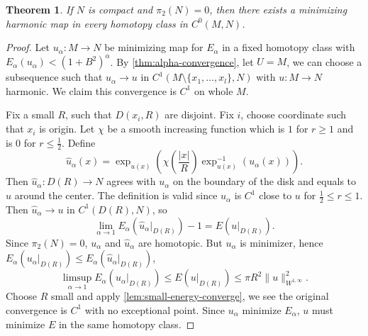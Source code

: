 \documentclass[UTF8,12pt]{article}
\theoremstyle{plain}\newtheorem{theorem}{Theorem}
\theoremstyle{definition}\newtheorem{definition}[theorem]{Definition}
\theoremstyle{definition}\newtheorem{example}[theorem]{Example}
\theoremstyle{plain}\newtheorem{axiom}[theorem]{Axiom}
\theoremstyle{plain}\newtheorem{assertion}[theorem]{Assertion}
\theoremstyle{plain}\newtheorem{corollary}[theorem]{Corollary}
\theoremstyle{plain}\newtheorem{lemma}[theorem]{Lemma}
\theoremstyle{plain}\newtheorem{proposition}[theorem]{Proposition}
\theoremstyle{plain}\newtheorem{prop}[theorem]{Proposition}
\theoremstyle{plain}\newtheorem{conjecture}[theorem]{Conjecture}
\theoremstyle{plain}\newtheorem{conj}[theorem]{Conjecture}
\theoremstyle{plain}\newtheorem{problem}[theorem]{Problem}
\theoremstyle{remark}\newtheorem{notation}[theorem]{Notation}
\theoremstyle{definition}\newtheorem*{question}{Question}
\theoremstyle{definition}\newtheorem*{answer}{Answer}
\theoremstyle{definition}\newtheorem*{goal}{Goal}
\theoremstyle{plain}\newtheorem*{application}{Application}
\theoremstyle{plain}\newtheorem*{exercise}{Exercise}
\theoremstyle{remark}\newtheorem*{remark}{Remark}
\theoremstyle{remark}\newtheorem*{note}{\small{Note}}
\numberwithin{equation}{section}
\numberwithin{theorem}{section}
\numberwithin{figure}{section}
\begin{document}
\begin{theorem}\label{thm:no-pi2}
    If \(N\) is compact and \(\pi_2(N)=0\), then there exists a minimizing harmonic
    map in every homotopy class in \(C^0(M,N)\).
\end{theorem}
\begin{proof}
    Let \(u_\alpha\colon M\to N\) be minimizing map for \(E_\alpha\) in a fixed
    homotopy class with \(E_\alpha(u_\alpha)<(1+B^2)^\alpha\). 
    By \cref{thm:alpha-convergence}, let \(U=M\), we can choose a subsequence such
    that \(u_\alpha\to u\) in \(C^1(M\setminus\{x_1,\ldots,x_l\},N)\) with \(u\colon
    M\to N\) harmonic. We claim this convergence is \(C^1\) on whole \(M\).

    Fix a small \(R\), such that \(D(x_i,R)\) are disjoint. Fix \(i\), choose
    coordinate such that \(x_i\) is origin. Let \(\chi\) be a smooth increasing
    function which is \(1\) for \(r\ge 1\) and is \(0\) for \(r\le \frac{1}{2}\).
    Define
    \begin{equation}\label{eq:def-modify-u}
        \hat{u}_\alpha(x)=\exp_{u(x)}\left(\chi\left(\frac{|x|}{R}\right)
        \exp^{-1}_{u(x)}(u_\alpha(x))\right)
    .\end{equation}
    Then \(\hat{u}_\alpha\colon D(R)\to N\) agrees with \(u_\alpha\) on the
    boundary of the disk and equals to \(u\) around the center. The definition is
    valid since \(u_\alpha\) is \(C^1\) close to \(u\) for \(\frac{1}{2}\le r\le 1\).
    Then \(\hat{u}_\alpha\to u\) in \(C^1(D(R),N)\), so \[
        \lim_{\alpha\to 1}E_\alpha(\hat{u}_\alpha\big|_{D(R)})-1=E(u\big|_{D(R)})
    .\] Since \(\pi_2(N)=0\), \(u_\alpha\) and \(\hat{u}_\alpha\) are homotopic.
    But \(u_\alpha\) is minimizer, hence \(E_\alpha(u_\alpha\big|_{D(R)})\le 
    E_\alpha(\hat{u}_\alpha\big|_{D(R)})\), \[
        \limsup_{\alpha\to 1}E_\alpha(u_\alpha\big|_{D(R)})
        \le E(u\big|_{D(R)})\le \pi R^2\|u\|_{W^{1,\infty}}^2
    .\] Choose \(R\) small and apply \cref{lem:small-energy-converge}, we see
    the original convergence is \(C^1\) with no exceptional point.
    Since \(u_\alpha\) minimize \(E_\alpha\), \(u\) must minimize \(E\) in
    the same homotopy class.
\end{proof}
\end{document}
